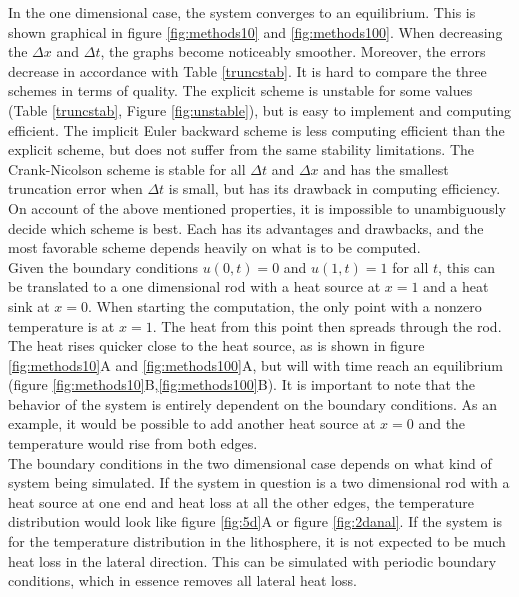 \documentclass[10pt,a4paper]{article}
\begin{document}
\noindent In the one dimensional case, the system converges to an equilibrium. This is shown graphical in figure \ref{fig:methods10} and \ref{fig:methods100}. When decreasing the $\Delta x$ and $\Delta t$, the graphs become noticeably smoother. Moreover, the errors decrease in accordance with Table \ref{truncstab}. It is hard to compare the three schemes in terms of quality. The explicit scheme is unstable for some values (Table \ref{truncstab}, Figure \ref{fig:unstable}), but is easy to implement and computing efficient. The implicit Euler backward scheme is less computing efficient than the explicit scheme, but does not suffer from the same stability limitations. The Crank-Nicolson scheme is stable for all $\Delta t$ and $\Delta x$ and has the smallest truncation error when $\Delta t$ is small, but has its drawback in computing efficiency. On account of the above mentioned properties, it is impossible to unambiguously decide which scheme is best. Each has its advantages and drawbacks, and the most favorable scheme depends heavily on what is to be computed.\\

\noindent Given the boundary conditions $u(0,t)=0$ and $u(1,t)=1$ for all $t$, this can be translated to a one dimensional rod with  a heat source at $x=1$ and a heat sink at $x=0$. When starting the computation, the only point with a nonzero temperature is at $x=1$. The heat from this point then spreads through the rod. The heat rises quicker close to the heat source, as is shown in figure \ref{fig:methods10}A and \ref{fig:methods100}A, but will with time reach an equilibrium (figure \ref{fig:methods10}B,\ref{fig:methods100}B). It is important to note that the behavior of the system is entirely dependent on the boundary conditions. As an example, it would be possible to add another heat source at $x=0$ and the temperature would rise from both edges.   
\\

\noindent The boundary conditions in the two dimensional case depends on what kind of system being simulated. If the system in question is a two dimensional rod with a heat source at one end and heat loss at all the other edges, the temperature distribution would look like figure \ref{fig:5d}A or figure \ref{fig:2danal}. If the system is for the temperature distribution in the lithosphere, it is not expected to be much heat loss in the lateral direction. This can be simulated with periodic boundary conditions, which in essence removes all lateral heat loss. 
\\
\end{document}
